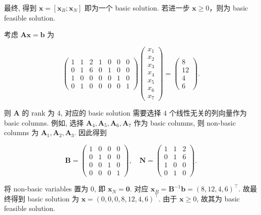 最终, 得到 $\bm{x} = [\bm{x}_B; \bm{x}_N]$ 即为一个 basic solution. 若进一步 $\bm{x} \geq 0$，则为 basic feasible solution.


\begin{exampleblock}{}
考虑 $\bm{A} \bm{x} = \bm{b}$ 为

\[
\begin{pmatrix}
  1 & 1 & 2 & 1 & 0 & 0 & 0\\
  0 & 1 & 6 & 0 & 1 & 0 & 0\\
  1 & 0 & 0 & 0 & 0 & 1 & 0\\
  0 & 1 & 0 & 0 & 0 & 0 & 1
\end{pmatrix}
\begin{pmatrix}
  x_1\\x_2\\x_3\\x_4\\x_5\\x_6\\x_7
\end{pmatrix}
=
\begin{pmatrix}
  8 \\ 12 \\ 4 \\ 6
\end{pmatrix}.
\]

则 $\bm{A}$ 的 rank 为 $4$, 对应的 basic solution 需要选择 $4$ 个线性无关的列向量作为 basic columns. 例如, 选择 $\bm{A}_4, \bm{A}_5, \bm{A}_6, \bm{A}_7$ 作为 basic columns, 则 non-basic columns 为 $\bm{A}_1, \bm{A}_2, \bm{A}_3$. 因此得到

\[
\bm{B} =
\begin{pmatrix}
  1 & 0 & 0 & 0\\
  0 & 1 & 0 & 0\\
  0 & 0 & 1 & 0\\
  0 & 0 & 0 & 1
\end{pmatrix},\quad
\bm{N} =
\begin{pmatrix}
  1 & 1 & 2\\
  0 & 1 & 6\\
  1 & 0 & 0\\
  0 & 1 & 0
\end{pmatrix}.
\]

将 non-basic variables 置为 $0$, 即 $\bm{x}_N = \bm{0}$. 对应 $\bm{x}_B = \bm{B}^{-1}\bm{b} = (8, 12, 4, 6)^\top$. 故最终得到 basic solution 为 $\bm{x} = (0, 0, 0, 8, 12, 4, 6)^\top$. 由于 $\bm{x} \geq 0$, 故其为 basic feasible solution.

\end{exampleblock}

